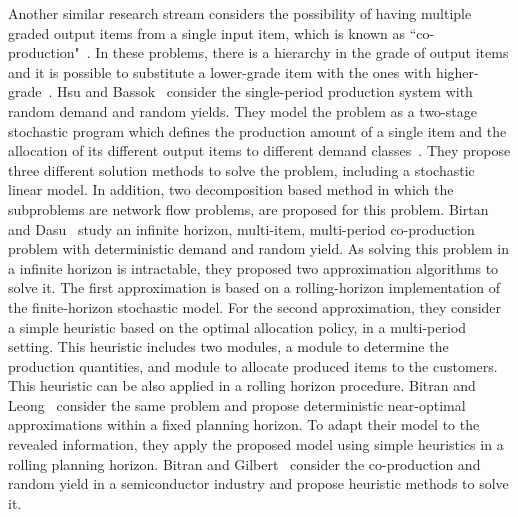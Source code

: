 \documentclass[10pt]{article}
\begin{document}
Another similar research stream considers the possibility of having multiple graded output items from a single input item, which is known as ``co-production"~\cite{ng2012robust}. In these problems, there is a hierarchy in the grade of output items and it is possible to substitute a lower-grade item with the ones with higher-grade~\cite{bitran1992ordering}. Hsu and Bassok~\cite{hsu1999random} consider the single-period production system with random demand  and random yields. 
They model the problem as a two-stage stochastic program which defines the production amount of a single item and the allocation of its different output items to different demand classes~\cite{hsu1999random}. They propose three different solution methods to solve the problem, including a stochastic linear model. In addition, two decomposition based method in which the subproblems are network flow problems, are proposed for this problem. 
Birtan and Dasu~\cite{bitran1992ordering} study an infinite horizon, multi-item, multi-period co-production problem with deterministic demand and random yield. As solving this problem in a infinite horizon is intractable, they proposed two approximation algorithms to solve it. The first approximation is based on a rolling-horizon implementation of the finite-horizon stochastic model. For the second approximation, they consider a simple heuristic based on the optimal allocation policy, in a multi-period setting. This heuristic includes two modules, a module to determine the production quantities, and module to allocate produced items to the customers. This heuristic can be also applied in a rolling horizon procedure. Bitran and Leong~\cite{bitran1992deterministic} consider the same problem and propose deterministic near-optimal approximations within a fixed planning horizon. To adapt their model to the revealed information, they apply the proposed model using simple heuristics in a rolling planning horizon.  Bitran and Gilbert~\cite{bitran1994co} consider the co-production and random yield in a semiconductor industry and propose heuristic methods to solve it. 
 
\end{document}
